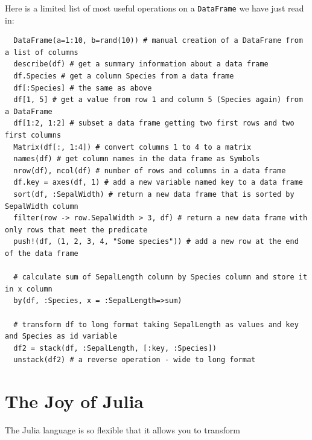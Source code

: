 \documentclass[10pt,a4paper]{article}
\begin{document}
Here is a limited list of most useful operations on a \lstinline|DataFrame| we have just read in:
\begin{lstlisting}
  DataFrame(a=1:10, b=rand(10)) # manual creation of a DataFrame from a list of columns
  describe(df) # get a summary information about a data frame
  df.Species # get a column Species from a data frame
  df[:Species] # the same as above
  df[1, 5] # get a value from row 1 and column 5 (Species again) from a DataFrame
  df[1:2, 1:2] # subset a data frame getting two first rows and two first columns
  Matrix(df[:, 1:4]) # convert columns 1 to 4 to a matrix
  names(df) # get column names in the data frame as Symbols
  nrow(df), ncol(df) # number of rows and columns in a data frame
  df.key = axes(df, 1) # add a new variable named key to a data frame
  sort(df, :SepalWidth) # return a new data frame that is sorted by SepalWidth column
  filter(row -> row.SepalWidth > 3, df) # return a new data frame with only rows that meet the predicate
  push!(df, (1, 2, 3, 4, "Some species")) # add a new row at the end of the data frame

  # calculate sum of SepalLength column by Species column and store it in x column
  by(df, :Species, x = :SepalLength=>sum)

  # transform df to long format taking SepalLength as values and key and Species as id variable
  df2 = stack(df, :SepalLength, [:key, :Species])
  unstack(df2) # a reverse operation - wide to long format
\end{lstlisting}


\section{The Joy of Julia}

The Julia language is so flexible that it allows you to transform
\end{document}
